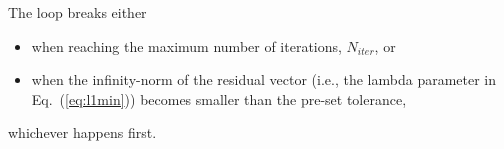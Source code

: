 \documentclass[11pt]{article} %
\begin{document}
The loop breaks either
\begin{itemize}
\item when reaching the maximum number of iterations, $N_{iter}$, or
\item when the infinity-norm of the residual vector (i.e., the lambda parameter in Eq.~(\ref{eq:l1min})) becomes smaller than the pre-set tolerance,
\end{itemize}
whichever happens first.
\end{document}
